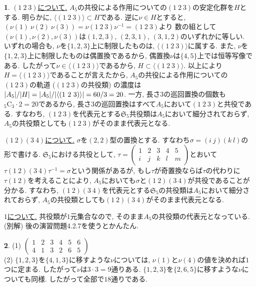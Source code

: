 \documentclass{amsart}
\theoremstyle{definition}
\newtheorem{ans}{}
\numberwithin{ans}{subsection}
\DeclarePairedDelimiter{\abs}{\lvert}{\rvert}
\begin{document}
\begin{ans}
  \underline{$(1\ 2\ 3)$について.}
  $A_5$の共役による作用についての$(1\ 2\ 3)$の安定化群を$H$とする.
  明らかに, $\langle(1\ 2\ 3)\rangle \subset H$である.
  逆に$\nu \in H$とすると, $(\nu(1)\ \nu(2)\ \nu(3)) = \nu(1\ 2\ 3)\nu^{-1} = (1\ 2\ 3)$より
  数の組として$(\nu(1), \nu(2), \nu(3))$は$(1, 2, 3)$, $(2, 3, 1)$, $(3, 1, 2)$のいずれかに等しい.
  いずれの場合も, $\nu$を$\{1, 2, 3\}$上に制限したものは, $\langle(1\ 2\ 3)\rangle$に属する.
  また, $\nu$を$\{1, 2, 3\}$上に制限したものは偶置換であるから, 偶置換$\nu$は$\{4, 5\}$上では恒等写像である.
  したがって$\nu \in \langle(1\ 2\ 3)\rangle$であるから, $H \subset \langle(1\ 2\ 3)\rangle$.
  以上により$H = \langle(1\ 2\ 3)\rangle$であることが言えたから,
  $A_5$の共役による作用についての$(1\ 2\ 3)$の軌道 ($(1\ 2\ 3)$の共役類) の濃度は$\abs{A_5}/\abs{H} = \abs{A_5}/\abs{\langle(1\ 2\ 3)\rangle} = 60 / 3 = 20$.
  一方, 長さ$3$の巡回置換の個数も${}_5\mathrm{C}_3 \cdot 2 = 20$であるから,
  長さ$3$の巡回置換はすべて$A_5$において$(1\ 2\ 3)$と共役である.
  すなわち, $(1\ 2\ 3)$を代表元とする$\mathfrak{S}_5$共役類は$A_5$において細分されておらず, $A_5$の共役類としても$(1\ 2\ 3)$がそのまま代表元となる.

  \underline{$(1\ 2)(3\ 4)$について.}
  $\sigma$を$(2, 2)$型の置換とする. すなわち$\sigma = (i\ j)(k\ l)$の形で書ける.
  $\mathfrak{S}_5$における共役として,
  $\tau = \begin{pmatrix*}
    1 & 2 & 3 & 4 & 5 \\
    i & j & k & l & m
  \end{pmatrix*}$とおいて$\tau(1\ 2)(3\ 4)\tau^{-1} = \sigma$という関係があるが,
  もし$\tau$が奇置換ならば$\tau$の代わりに$\tau(1\ 2)$を考えることにより,
  $A_5$においても$\sigma$と$(1\ 2)(3\ 4)$が共役であることが分かる.
  すなわち, $(1\ 2)(3\ 4)$を代表元とする$\mathfrak{S}_5$の共役類は$A_5$において細分されておらず, $A_5$の共役類としても$(1\ 2)(3\ 4)$がそのまま代表元となる.

  \underline{$1$について.} 共役類が$1$元集合なので, そのまま$A_5$の共役類の代表元となっている.\\
  (別解) 後の演習問題4.2.7を使うとかんたん.
\end{ans}

\begin{ans}
  (1) $\begin{pmatrix*}
    1 & 2 & 3 & 4 & 5 & 6 \\
    4 & 1 & 3 & 2 & 6 & 5
  \end{pmatrix*}$\\
  (2) $\{1, 2, 3\}$を$\{4, 1, 3\}$に移すような$\nu$については,
  $\nu(1)$と$\nu(4)$の値を決めれば$1$つに定まる. したがって$\nu$は$3 \cdot 3 = 9$通りある.
  $\{1, 2, 3\}$を$\{2, 6, 5\}$に移すような$\nu$についても同様. したがって全部で$18$通りである.
\end{ans}
\end{document}

